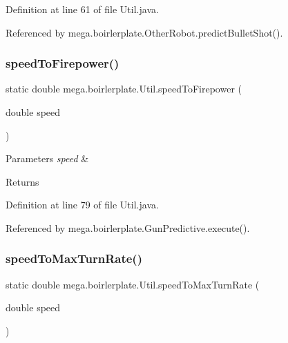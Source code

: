 Definition at line 61 of file Util.\+java.



Referenced by mega.\+boirlerplate.\+Other\+Robot.\+predict\+Bullet\+Shot().

\mbox{\label{classmega_1_1boirlerplate_1_1_util_a66f5757c5ac6ab4614fa72cc9174e7c7}} 
\subsubsection{\texorpdfstring{speed\+To\+Firepower()}{speedToFirepower()}}
{\footnotesize\ttfamily static double mega.\+boirlerplate.\+Util.\+speed\+To\+Firepower (\begin{DoxyParamCaption}\item[{double}]{speed }\end{DoxyParamCaption})\hspace{0.3cm}{\ttfamily [static]}}


\begin{DoxyParams}{Parameters}
{\em speed} & \\
\hline
\end{DoxyParams}
\begin{DoxyReturn}{Returns}

\end{DoxyReturn}


Definition at line 79 of file Util.\+java.



Referenced by mega.\+boirlerplate.\+Gun\+Predictive.\+execute().

\mbox{\label{classmega_1_1boirlerplate_1_1_util_a4b64841d046d559840b1f7a0096e6e9c}} 
\subsubsection{\texorpdfstring{speed\+To\+Max\+Turn\+Rate()}{speedToMaxTurnRate()}}
{\footnotesize\ttfamily static double mega.\+boirlerplate.\+Util.\+speed\+To\+Max\+Turn\+Rate (\begin{DoxyParamCaption}\item[{double}]{speed }\end{DoxyParamCaption})\hspace{0.3cm}{\ttfamily [static]}}



